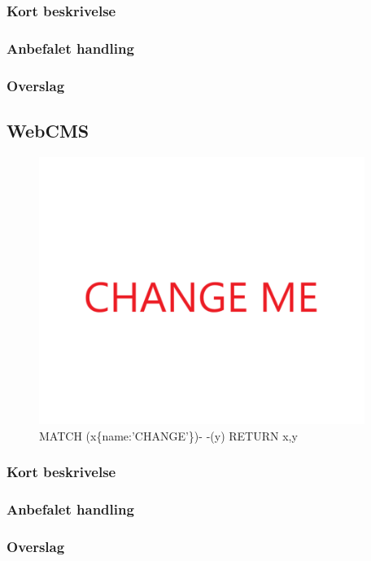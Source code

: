 \documentclass{article}
\begin{document}
\subsubsection{Kort beskrivelse}
\subsubsection{Anbefalet handling}
\subsubsection{Overslag}
\subsection{WebCMS}
\begin{figure}[h]
\includegraphics[width=300pt]{CHANGE.PNG}
\caption{MATCH (x\{name:'CHANGE'\})- -(y) RETURN x,y}
\end{figure}
\subsubsection{Kort beskrivelse}
\subsubsection{Anbefalet handling}
\subsubsection{Overslag}
\end{document}
